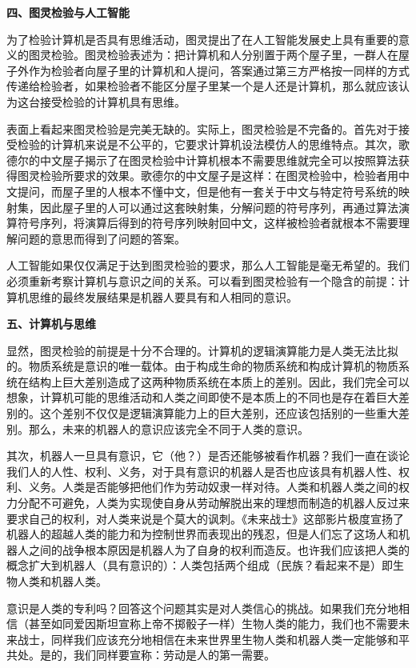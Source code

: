 \textbf{四、图灵检验与人工智能}

为了检验计算机是否具有思维活动，图灵提出了在人工智能发展史上具有重要的意义的图灵检验。图灵检验表述为：把计算机和人分别置于两个屋子里，一群人在屋子外作为检验者向屋子里的计算机和人提问，答案通过第三方严格按一同样的方式传递给检验者，如果检验者不能区分屋子里某一个是人还是计算机，那么就应该认为这台接受检验的计算机具有思维。

表面上看起来图灵检验是完美无缺的。实际上，图灵检验是不完备的。首先对于接受检验的计算机来说是不公平的，它要求计算机设法模仿人的思维特点。其次，歌德尔的中文屋子揭示了在图灵检验中计算机根本不需要思维就完全可以按照算法获得图灵检验所要求的效果。歌德尔的中文屋子是这样：在图灵检验中，检验者用中文提问，而屋子里的人根本不懂中文，但是他有一套关于中文与特定符号系统的映射集，因此屋子里的人可以通过这套映射集，分解问题的符号序列，再通过算法演算符号序列，将演算后得到的符号序列映射回中文，这样被检验者就根本不需要理解问题的意思而得到了问题的答案。

人工智能如果仅仅满足于达到图灵检验的要求，那么人工智能是毫无希望的。我们必须重新考察计算机与意识之间的关系。可以看到图灵检验有一个隐含的前提：计算机思维的最终发展结果是机器人要具有和人相同的意识。

\textbf{五、计算机与思维}

显然，图灵检验的前提是十分不合理的。计算机的逻辑演算能力是人类无法比拟的。物质系统是意识的唯一载体。由于构成生命的物质系统和构成计算机的物质系统在结构上巨大差别造成了这两种物质系统在本质上的差别。因此，我们完全可以想象，计算机可能的思维活动和人类之间即使不是本质上的不同也是存在着巨大差别的。这个差别不仅仅是逻辑演算能力上的巨大差别，还应该包括别的一些重大差别。那么，未来的机器人的意识应该完全不同于人类的意识。

其次，机器人一旦具有意识，它（他？）是否还能够被看作机器？我们一直在谈论我们人的人性、权利、义务，对于具有意识的机器人是否也应该具有机器人性、权利、义务。人类是否能够把他们作为劳动奴隶一样对待。人类和机器人类之间的权力分配不可避免，人类为实现使自身从劳动解脱出来的理想而制造的机器人反过来要求自己的权利，对人类来说是个莫大的讽刺。《未来战士》这部影片极度宣扬了机器人的超越人类的能力和为控制世界而表现出的残忍，但是人们忘了这场人和机器人之间的战争根本原因是机器人为了自身的权利而造反。也许我们应该把人类的概念扩大到机器人（具有意识的）：人类包括两个组成（民族？看起来不是）即生物人类和机器人类。

意识是人类的专利吗？回答这个问题其实是对人类信心的挑战。如果我们充分地相信（甚至如同爱因斯坦宣称上帝不掷骰子一样）生物人类的能力，我们也不需要未来战士，同样我们应该充分地相信在未来世界里生物人类和机器人类一定能够和平共处。是的，我们同样要宣称：劳动是人的第一需要。